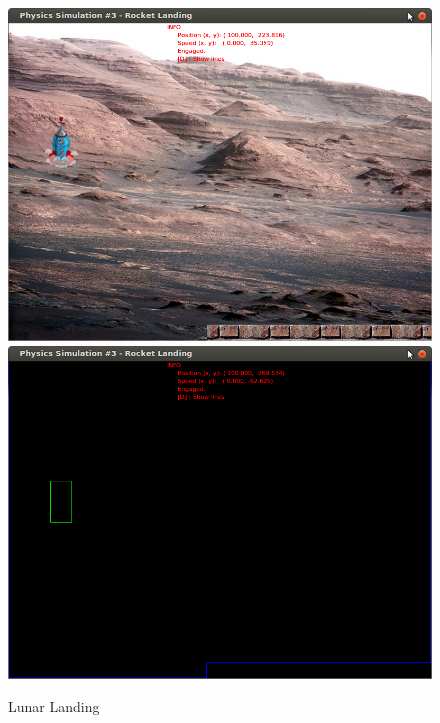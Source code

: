 \begin{figure}[H]
\centering
\caption{Lunar Landing}
  \includegraphics[scale=0.4]{images/lunarLanding.png}
  \includegraphics[scale=0.4]{images/lunarLandingE.png}
\end{figure}

